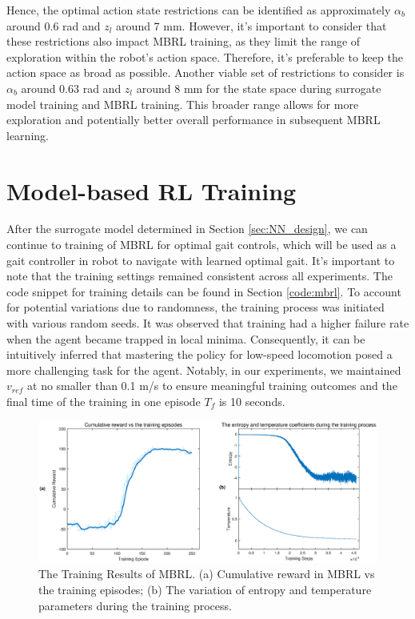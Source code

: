 Hence, the optimal action state restrictions can be identified as approximately $\alpha_b$ around 0.6 rad and $z_l$ around 7 mm. However, it's important to consider that these restrictions also impact MBRL training, as they limit the range of exploration within the robot's action space. Therefore, it's preferable to keep the action space as broad as possible. Another viable set of restrictions to consider is $\alpha_b$ around 0.63 rad and $z_l$ around 8 mm for the state space during surrogate model training and MBRL training. This broader range allows for more exploration and potentially better overall performance in subsequent MBRL learning.

\section{Model-based RL Training}
After the surrogate model determined in Section \ref{sec:NN_design}, we can continue to training of MBRL for optimal gait controls, which will be used as a gait controller in robot to navigate with learned optimal gait. It's important to note that the training settings remained consistent across all experiments. The code snippet for training details can be found in Section \ref{code:mbrl}. To account for potential variations due to randomness, the training process was initiated with various random seeds. It was observed that training had a higher failure rate when the agent became trapped in local minima. Consequently, it can be intuitively inferred that mastering the policy for low-speed locomotion posed a more challenging task for the agent. Notably, in our experiments, we maintained $v_{ref}$ at no smaller than 0.1 m/s to ensure meaningful training outcomes and the final time of the training in one episode $T_f$ is 10 seconds.
\begin{figure}[htb]
    \centering
    \includegraphics[width=\linewidth]{img/chap5/MBRL_tr.eps}
    \caption{The Training Results of MBRL. (a) Cumulative reward in MBRL vs the training episodes; (b) The variation of entropy and temperature parameters during the training process.}
    \label{fig:MBRL_tr}
\end{figure}

